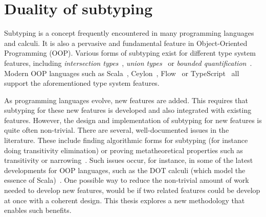 



\section{Duality of subtyping}
\label{sec:intro:duo}


Subtyping is a concept frequently encountered in many programming
languages and calculi. It is also a pervasive and fundamental
feature in Object-Oriented Programming (OOP). Various forms of
subtyping exist for different type system features, including
\emph{intersection types}~\citep{barbanera1995intersection}, 
\emph{union types}~\citep{barbanera1995intersection} or 
\emph{bounded quantification}~\citep{canning1989f}. 
Modern OOP languages such as Scala~\citep{odersky2004overview},
Ceylon~\citep{king2013ceylon}, Flow~\citep{chaudhuri2015flow} or 
TypeScript~\citep{bierman2014understanding} all support the 
aforementioned type system features. 

As programming languages evolve, new features are added.
This requires that subtyping for these new features is
developed and also integrated with existing features. However, the
design and implementation of subtyping for new features is quite often
non-trivial. There are several, well-documented
issues in the literature. These include finding algorithmic forms for
subtyping (for instance doing transitivity elimination)
\citep{steffen1994higher} or
proving metatheoretical properties such as transitivity or
narrowing~\citep{abel2008syntactic}. Such issues occur, 
for instance, in some of the 
latest developments for OOP languages, such as the DOT
calculi (which model the essence of Scala)~\citep{amin2012dependent}.
One possible way to reduce the non-trivial amount of work needed to develop
new features, would be if two related features could be develop at once
with a coherent design. This thesis explores a new methodology that
enables such benefits.

